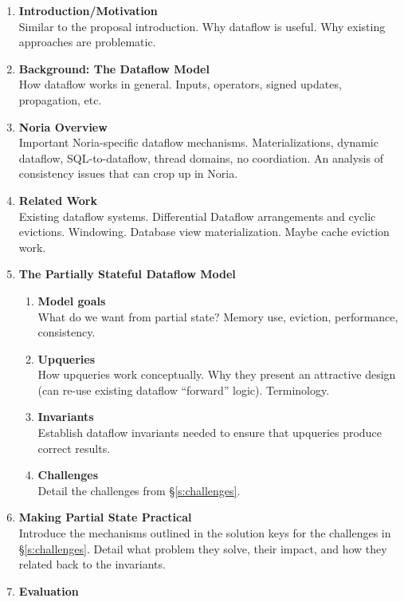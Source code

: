 \documentclass[fontsize=12pt,paper=letter]{scrartcl}
\begin{document}
\begin{enumerate}

 \item \textbf{Introduction/Motivation}\\
   Similar to the proposal introduction. Why dataflow is useful. Why
   existing approaches are problematic.
 \item \textbf{Background: The Dataflow Model}\\
   How dataflow works in general. Inputs, operators, signed updates,
   propagation, etc.
 \item \textbf{Noria Overview}\\
   Important Noria-specific dataflow mechanisms. Materializations,
   dynamic dataflow, SQL-to-dataflow, thread domains, no coordiation.
   An analysis of consistency issues that can crop up in Noria.
 \item \textbf{Related Work}\\
   Existing dataflow systems. Differential Dataflow arrangements and
   cyclic evictions. Windowing. Database view materialization. Maybe
   cache eviction work.
 \item \textbf{The Partially Stateful Dataflow Model}
   \begin{enumerate}
   \item \textbf{Model goals}\\
     What do we want from partial state? Memory use, eviction,
     performance, consistency.
   \item \textbf{Upqueries}\\
     How upqueries work conceptually. Why they present an attractive
     design (can re-use existing dataflow ``forward'' logic). Terminology.
   \item \textbf{Invariants}\\
     Establish dataflow invariants needed to ensure that upqueries
     produce correct results.
   \item \textbf{Challenges}\\
     Detail the challenges from \S\ref{s:challenges}.
   \end{enumerate}
 \item \textbf{Making Partial State Practical}\\
   Introduce the mechanisms outlined in the solution keys for the
   challenges in \S\ref{s:challenges}. Detail what problem they solve,
   their impact, and how they related back to the invariants.
 \item \textbf{Evaluation}
   \begin{enumerate}

\end{enumerate}
\end{enumerate}
\end{document}
